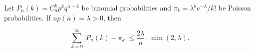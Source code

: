 Let $P_n(k) = C_n^k p^k q^{n-k}$ be binomial probabilities and $\pi_k = \lambda^k e^{-\lambda}/k!$ be Poisson probabilities. If $np(n) = \lambda > 0$, then

$$\sum_{k=0}^{\infty} \left| P_n(k) - \pi_k \right| \leq \frac{2\lambda}{n} \cdot \min(2, \lambda).$$
